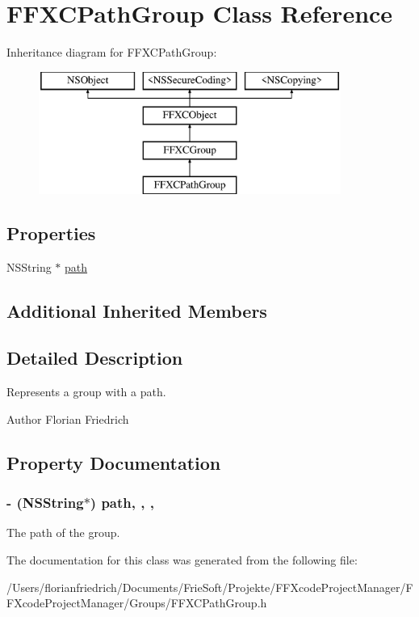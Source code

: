 \hypertarget{interface_f_f_x_c_path_group}{\section{F\-F\-X\-C\-Path\-Group Class Reference}
\label{interface_f_f_x_c_path_group}
}
Inheritance diagram for F\-F\-X\-C\-Path\-Group\-:\begin{figure}[H]
\begin{center}
\leavevmode
\includegraphics[height=4.000000cm]{interface_f_f_x_c_path_group}
\end{center}
\end{figure}
\subsection*{Properties}
\begin{DoxyCompactItemize}
\item 
N\-S\-String $\ast$ \hyperlink{interface_f_f_x_c_path_group_a5552179bb57b10de7dfd8b47e47a76d1}{path}
\end{DoxyCompactItemize}
\subsection*{Additional Inherited Members}


\subsection{Detailed Description}
Represents a group with a path. \begin{DoxyAuthor}{Author}
Florian Friedrich 
\end{DoxyAuthor}


\subsection{Property Documentation}
\hypertarget{interface_f_f_x_c_path_group_a5552179bb57b10de7dfd8b47e47a76d1}{
\subsubsection[{path}]{\setlength{\rightskip}{0pt plus 5cm}-\/ (N\-S\-String$\ast$) path\hspace{0.3cm}{\ttfamily [read]}, {\ttfamily [write]}, {\ttfamily [nonatomic]}, {\ttfamily [strong]}}}\label{interface_f_f_x_c_path_group_a5552179bb57b10de7dfd8b47e47a76d1}
The path of the group. 

The documentation for this class was generated from the following file\-:\begin{DoxyCompactItemize}
\item 
/\-Users/florianfriedrich/\-Documents/\-Frie\-Soft/\-Projekte/\-F\-F\-Xcode\-Project\-Manager/\-F\-F\-Xcode\-Project\-Manager/\-Groups/F\-F\-X\-C\-Path\-Group.\-h\end{DoxyCompactItemize}

